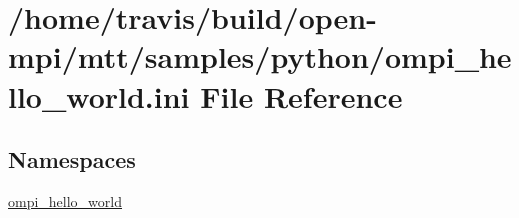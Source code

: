 \hypertarget{ompi__hello__world_8ini}{\section{/home/travis/build/open-\/mpi/mtt/samples/python/ompi\-\_\-hello\-\_\-world.ini File Reference}
\label{ompi__hello__world_8ini}
}
\subsection*{Namespaces}
\begin{DoxyCompactItemize}
\item 
\hyperlink{namespaceompi__hello__world}{ompi\-\_\-hello\-\_\-world}
\end{DoxyCompactItemize}
